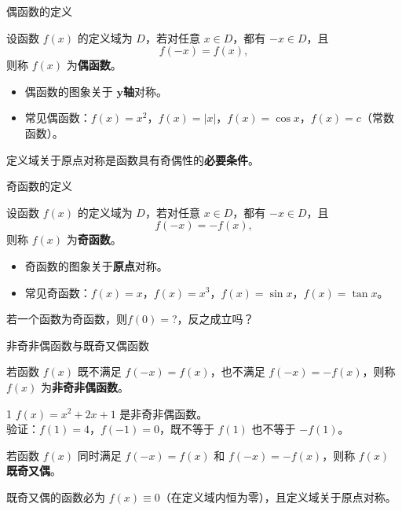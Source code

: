 \begin{frame}{偶函数的定义}
	\begin{definition}[偶函数]
		设函数 $f(x)$ 的定义域为 $D$，若对任意 $x\in D$，都有 $-x\in D$，且
		\[
		f(-x)=f(x),
		\]
		则称 $f(x)$ 为\textbf{偶函数}。
	\end{definition}
	\pause
	\begin{remark}
		\begin{itemize}
			\item 偶函数的图象关于 $\bm{y}$\textbf{轴}对称。
			\item 常见偶函数：$f(x)=x^2$，$f(x)=|x|$，$f(x)=\cos x$，$f(x)=c$（常数函数）。
		\end{itemize}
	\end{remark}
	\begin{tip}
		定义域关于原点对称是函数具有奇偶性的\textbf{必要条件}。
	\end{tip}
\end{frame}

\begin{frame}{奇函数的定义}
	\begin{definition}[奇函数]
		设函数 $f(x)$ 的定义域为 $D$，若对任意 $x\in D$，都有 $-x\in D$，且
		\[
		f(-x)=-f(x),
		\]
		则称 $f(x)$ 为\textbf{奇函数}。
	\end{definition}
	\pause
	\begin{remark}
		\begin{itemize}
			\item 奇函数的图象关于\textbf{原点}对称。
			\item 常见奇函数：$f(x)=x$，$f(x)=x^3$，$f(x)=\sin x$，$f(x)=\tan x$。
		\end{itemize}
	\end{remark}
	
\end{frame}
\begin{frame}
	\begin{sikao}
		若一个函数为奇函数，则$f(0)=$?，反之成立吗？
	\end{sikao}	
\end{frame}
\begin{frame}[allowframebreaks]{非奇非偶函数与既奇又偶函数}
	\begin{definition}[非奇非偶函数]
		若函数 $f(x)$ 既不满足 $f(-x)=f(x)$，也不满足 $f(-x)=-f(x)$，则称 $f(x)$ 为\textbf{非奇非偶函数}。
	\end{definition}
	
	\begin{example}{1}
		$f(x)=x^2+2x+1$ 是非奇非偶函数。\\
		验证：$f(1)=4$，$f(-1)=0$，既不等于 $f(1)$ 也不等于 $-f(1)$。
	\end{example}
	
	\begin{definition}[既奇又偶函数]
		若函数 $f(x)$ 同时满足 $f(-x)=f(x)$ 和 $f(-x)=-f(x)$，则称 $f(x)$ \textbf{既奇又偶}。
	\end{definition}
	
	\begin{theorem}
		既奇又偶的函数必为 $f(x)\equiv 0$（在定义域内恒为零），且定义域关于原点对称。
	\end{theorem}
\end{frame}
